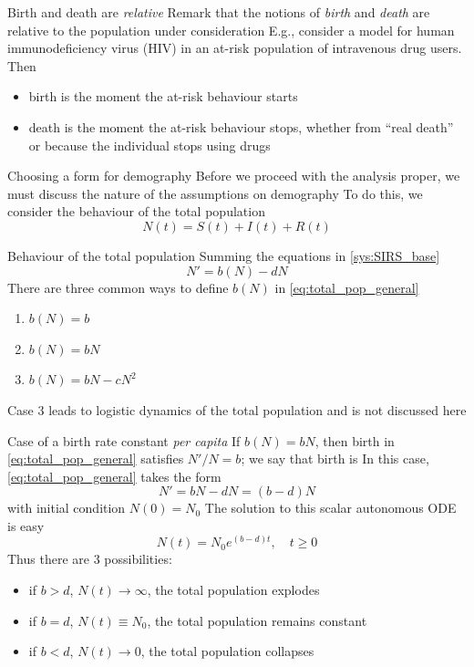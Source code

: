 \documentclass[aspectratio=43]{beamer}
\begin{document}
\begin{frame}{Birth and death are \emph{relative}}
  Remark that the notions of \emph{birth} and \emph{death} are relative to the population under consideration
  \vfill
  E.g., consider a model for human immunodeficiency virus (HIV) in an at-risk population of intravenous drug users. Then
  \begin{itemize}
    \item birth is the moment the at-risk behaviour starts 
    \item death is the moment the at-risk behaviour stops,  whether from ``real death'' or because the individual stops using drugs
  \end{itemize}
\end{frame}

\begin{frame}{Choosing a form for demography}
Before we proceed with the analysis proper, we must discuss the nature of the assumptions on demography
\vfill
To do this, we consider the behaviour of the total population 
\[
N(t)=S(t)+I(t)+R(t)
\]
\end{frame}

\begin{frame}{Behaviour of the total population}
Summing the equations in \eqref{sys:SIRS_base}
\begin{equation}\label{eq:total_pop_general}
N'=b(N)-dN
\end{equation}
\vfill
There are three common ways to define $b(N)$ in \eqref{eq:total_pop_general}
\begin{enumerate}
\item $b(N)=b$
\item $b(N)=bN$
\item $b(N)=bN-cN^2$
\end{enumerate}
\vfill
Case 3 leads to logistic dynamics of the total population and is not discussed here
\end{frame}


\begin{frame}{Case of a birth rate constant \emph{per capita}}
If $b(N)=bN$, then birth in \eqref{eq:total_pop_general} satisfies $N'/N=b$; we say that birth is 
\vfill
In this case, \eqref{eq:total_pop_general} takes the form
\[
N'=bN-dN=(b-d)N
\]
with initial condition $N(0)=N_0$
\vfill
The solution to this scalar autonomous ODE is easy
\[
N(t)=N_0e^{(b-d)t},\quad t\geq 0
\]
Thus there are 3 possibilities:
\begin{itemize}
  \item if $b>d$, $N(t)\to\infty$, the total population explodes 
  \item if $b=d$, $N(t)\equiv N_0$, the total population remains constant 
  \item if $b<d$, $N(t)\to 0$, the total population collapses
\end{itemize}
\end{frame}
\end{document}
